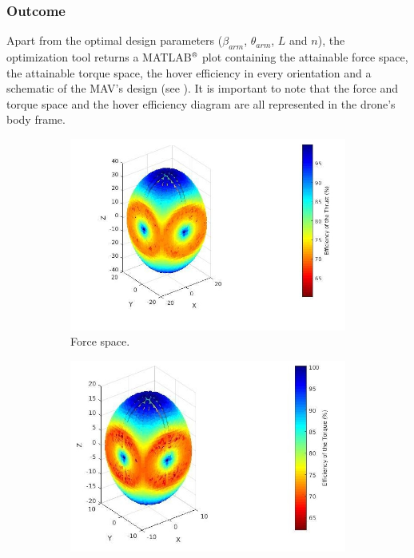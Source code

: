 \subsubsection{Outcome}
\label{sec:outcome}
Apart from the optimal design parameters ($\beta_{arm}$, $\theta_{arm}$, $L$ and $n$), the
optimization tool returns a MATLAB$^\textrm{\textregistered}$ plot containing
the attainable force space, the attainable torque space, the hover efficiency in
every orientation and a schematic of the MAV’s design (see ).
It is important to note that the force and torque space and the hover efficiency
diagram are all represented in the drone’s body frame.
\begin{figure}[!h]
  \begin{subfigure}[b]{0.48\textwidth}
    \includegraphics[width=\linewidth]{images/n=4_force.jpg}
    \caption{Force space.} \label{fig:tool_outputa}
  \end{subfigure}
  \hspace*{\fill} %
  \begin{subfigure}[b]{0.48\textwidth}
    \includegraphics[width=\linewidth]{images/n=4_torque.jpg}

\end{subfigure}
\end{figure}
